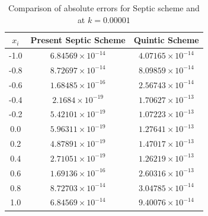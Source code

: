 \documentclass[10pt,letterpaper,twoside]{article}
\begin{document}
\begin{table}[H]
 \centering
 \small
 \caption{Comparison of absolute errors for Septic scheme and \cite{35} at $k = 0.00001$}
 \label{T.01}
 \renewcommand{\arraystretch}{1.1}
 \begin{tabular}{|c|c|c|}
  \hline
  \textbf{$x_{i}$} & \textbf{Present Septic Scheme} & \textbf{Quintic Scheme \cite{35}} \\ \hline 
  -1.0 & $6.84569\times10^{-14}$ & $4.07165 \times 10^{-14}$ \\ \hline
  -0.8 & $8.72697\times10^{-14}$ & $8.09859 \times 10^{-14}$ \\ \hline
  -0.6 & $1.68485\times10^{-16}$ & $2.56743 \times 10^{-14}$ \\ \hline
  -0.4 & $2.1684\times10^{-19}$ & $1.70627 \times 10^{-13}$ \\ \hline
  -0.2 & $5.42101\times10^{-19}$ & $1.07223 \times 10^{-13}$ \\ \hline
  0.0  & $5.96311\times10^{-19}$ & $1.27641 \times 10^{-13}$ \\ \hline
  0.2  & $4.87891\times10^{-19}$ & $1.47017 \times 10^{-13}$ \\ \hline
  0.4  & $2.71051\times10^{-19}$ & $1.26219 \times 10^{-13}$ \\ \hline
  0.6  & $1.69136\times10^{-16}$ & $2.60316 \times 10^{-13}$ \\ \hline
  0.8  & $8.72703\times10^{-14}$ & $3.04785 \times 10^{-14}$ \\ \hline
  1.0  & $6.84569\times10^{-14}$ & $9.40076 \times 10^{-14}$ \\ \hline
 \end{tabular}
\end{table}
\end{document}
